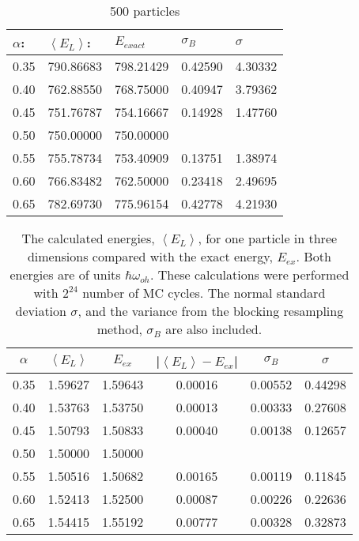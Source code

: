 \begin{table}[H]\caption{500 particles}\label{tab:brute_force_N_500}
\begin{tabular}{lllll}
$\alpha$: & $\left< E_L \right>$:& $E_{exact}$ & $\sigma_B$ & $\sigma$\\ \hline
0.35 & 790.86683 & 798.21429 & 0.42590 & 4.30332\\
0.40 & 762.88550 & 768.75000 & 0.40947 & 3.79362\\
0.45 & 751.76787 & 754.16667 & 0.14928 & 1.47760\\
0.50 & 750.00000 & 750.00000 &                 &                \\ 
0.55 & 755.78734 & 753.40909 & 0.13751 & 1.38974\\
0.60 & 766.83482 & 762.50000 & 0.23418 & 2.49695\\
0.65 & 782.69730 & 775.96154 & 0.42778 & 4.21930\\
\end{tabular}
\end{table} 

\begin{table}[H]\caption{The calculated energies, $\left<E_L\right>$, for one particle in three dimensions compared with the exact energy, $E_{ex}$. Both energies are of units $\hbar\omega_{oh}$. These calculations were performed with $2^{24}$ number of MC cycles. The normal standard deviation $\sigma$, and the variance from the blocking resampling method, $\sigma_B$ are also included. }\label{tab:brute_force_N_1_MC_boost}
\center
\begin{tabular}{cccccc}
$\alpha$ & $\left< E_L \right>$ & $E_{ex}$ & |$\left< E_L \right>-E_{ex}$|  & $\sigma_B$ & $\sigma$\\ \hline
0.35 & 1.59627 & 1.59643 & 0.00016 & 0.00552 & 0.44298\\
0.40 & 1.53763 & 1.53750 & 0.00013 & 0.00333 & 0.27608\\
0.45 & 1.50793 & 1.50833 & 0.00040 & 0.00138 & 0.12657\\
0.50 & 1.50000 & 1.50000 &                &                &                 \\
0.55 & 1.50516 & 1.50682 & 0.00165 & 0.00119 & 0.11845\\
0.60 & 1.52413 & 1.52500 & 0.00087 & 0.00226 & 0.22636\\
0.65 & 1.54415 & 1.55192 & 0.00777 & 0.00328 & 0.32873\\
\end{tabular}
\end{table} 

